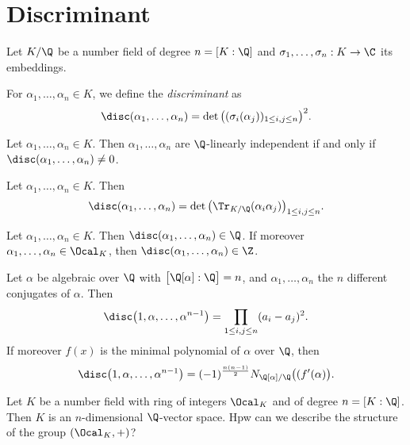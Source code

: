 \section{Discriminant}

Let \( K/\Q \) be a number field of degree \( n = [K:\Q] \) and \( \sigma_1, \dotsc, \sigma_n: K \to \C \) its embeddings.

\begin{defn*}[Discriminant]
	For \( \alpha_1, \dotsc, \alpha_n \in K \), we define the \emph{discriminant} as
	\[ \disc(\alpha_1, \dotsc, \alpha_n) = \det\big( (\sigma_i(\alpha_j))_{1 \leq i,j \leq n} \big)^2. \]
\end{defn*}

\begin{thmn}
	Let \( \alpha_1, \dotsc, \alpha_n \in K \).
	Then \( \alpha_1, \dotsc, \alpha_n \) are \( \Q \)-linearly independent if and only if \( \disc(\alpha_1, \dotsc, \alpha_n) \neq 0 \).
\end{thmn}

\begin{lem}
	Let \( \alpha_1, \dotsc, \alpha_n \in K \). Then
	\[ \disc(\alpha_1, \dotsc, \alpha_n) = \det \big( \Tr_{K/\Q} (\alpha_i \alpha_j) \big)_{1 \leq i,j \leq n}. \]
\end{lem}

\begin{cor}
	Let \( \alpha_1, \dotsc, \alpha_n \in K \).
	Then \( \disc(\alpha_1, \dotsc, \alpha_n) \in \Q \).
	If moreover \( \alpha_1, \dotsc, \alpha_n \in \Ocal_K \), then \( \disc(\alpha_1, \dotsc, \alpha_n) \in \Z \).
\end{cor}

\begin{thmn}
	Let \( \alpha \) be algebraic over \( \Q \) with \( \big[ \Q[\alpha] : \Q \big] = n \), and \( \alpha_1, \dotsc, \alpha_n \) the \( n \) different conjugates of \( \alpha \).
	Then
	\[ \disc \big( 1, \alpha, \dotsc, \alpha^{n-1} \big) = \prod_{1 \leq i,j \leq n} (a_i - a_j)^2. \]
	If moreover \( f(x) \) is the minimal polynomial of \( \alpha \) over \( \Q \), then
	\[ \disc \big(1, \alpha, \dotsc, \alpha^{n-1} \big) = (-1)^\frac{n(n-1)}{2} N_{\Q[\alpha]/\Q} \big( (f'(\alpha) \big). \]
\end{thmn}

\begin{frage*}
	Let \( K \) be a number field with ring of integers \( \Ocal_K \) and of degree \( n = [K:\Q] \).
	Then \( K \) is an \( n \)-dimensional \( \Q \)-vector space.
	Hpw can we describe the structure of the group \( (\Ocal_K, +) \)?
\end{frage*}

